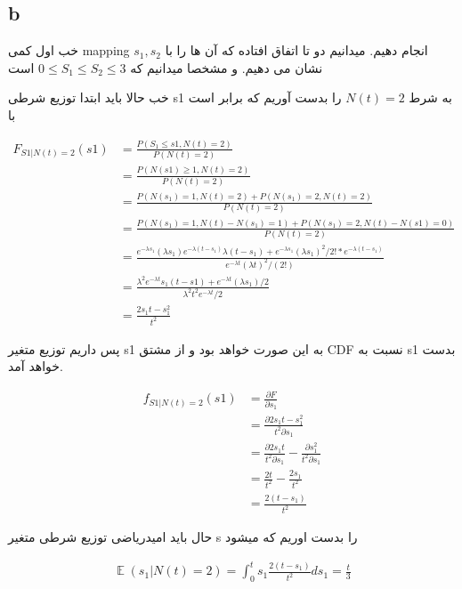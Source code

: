 \documentclass{article}[12pt]
\DeclareMathOperator{\EX}{\mathbb{E}}%
\begin{document}
\subsection{b}

خب اول کمی mapping انجام دهیم. 
میدانیم دو تا اتفاق افتاده که آن ها را با 
$s_1,s_2$
نشان می دهیم. و مشخصا
میدانیم که 
$0 \leq S_1 \leq S_2 \leq 3$
است

خب حالا باید ابتدا توزیع شرطی s1 به شرط 
$N(t)=2$
را بدست آوریم که برابر است با

\begin{equation}
\begin{split}
F_{S1|N(t)=2}(s1) &=
\frac{
P(S_1 \leq s1 , N(t) = 2) }
{
P(N(t)=2)
} \\& = 
\frac{
P( N(s1) \geq 1 ,N(t) = 2)}
{
P(N(t)=2)
}
\\& =\frac {P(N(s_1)=1,N(t)=2)+P(N(s_1)=2,N(t)=2)} {P(N(t)=2)}
\\& = 
\frac{
P(N(s_1)=1, N(t)-N(s_1)=1) + P(N(s_1)=2,N(t)-N(s1)=0)}
{P(N(t)=2)}
\\& = 
\frac{e^{-\lambda s_1 }(\lambda s_1)
e^{-\lambda (t-s_1)} \lambda(t-s_1)
+ e^{-\lambda s_1} (\lambda s_1)^2 / 2! * 
e^{-\lambda (t-s_1)}
 }
{
e^{-\lambda t}(\lambda t)^2 /(2!)
} 
\\ &=
\frac{
 \lambda^2 e^{- \lambda t} s_1 (t-s1) + 
 e^{-\lambda t} (\lambda s_1) / 2
}{
\lambda ^2 t^2 e^{-\lambda t} /2
} 
\\
&=
\frac{2 s_1 t - s_1^2}{t^2}
\end{split}
\end{equation}

پس داریم توزیع متغیر s1 به این صورت خواهد بود و از مشتق CDF نسبت به s1 بدست خواهد آمد.

\begin{equation}
\begin{split}
f_{S1|N(t)=2}(s1) &= 
\frac{\partial F}{\partial s_1}\\&= 
\frac{\partial 2s_1 t - s_1^2 }{t^2 \partial s_1} \\& =
\frac{\partial 2 s_1 t }{t^2 \partial s_1} - 
\frac{\partial s_1^2 }{t^2 \partial s_1} \\& 
= \frac{2t}{t^2} - \frac{2s_1}{t^2} \\& 
= \frac{2(t-s_1)}{t^2}
\end{split}
\end{equation}

حال باید امیدریاضی توزیع شرطی متغیر s
را بدست اوریم که میشود

\begin{equation}
\begin{split}
\EX(s_1 | N(t)=2) = \int_{0}^{t}
s_1 \frac{2(t-s_1)}{t^2} ds_1= \frac{t}{3}
\end{split}
\end{equation}
\end{document}
